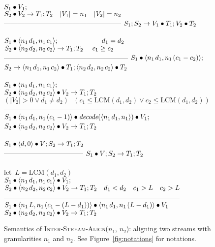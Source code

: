 \renewcommand{\skiptopa}[0]{\vspace{-2pt}\\}
\begin{figure}[t]
$S_1 \bullet V_1;$\skiptopa
$S_2 \bullet V_2 \rightarrow T_1; T_2~~~|V_1| = n_1~~~|V_2| = n_2$\vspace{-1pt}\skiptopa
---------------------------------------------------\skipbot
$S_1; S_2 \rightarrow V_1 \bullet T_1; V_2 \bullet T_2$
~ \\ ~ \\
$S_1 \bullet \langle n_1{\hspace{1.3pt}}d_1, n_1{\hspace{1.3pt}}c_1\rangle;~~~~~~~~~~~~~~~~~~~d_1 = d_2$\skiptopa
$S_2 \bullet \langle n_2{\hspace{1.3pt}}d_2, n_2{\hspace{1.3pt}}c_2\rangle \rightarrow T_1; T_2~~~~c_1 \ge c_2$\vspace{-2pt}\skiptopa
------------------------------------------------------\skipbot
$S_1 \bullet \langle n_1{\hspace{1.3pt}}d_1, n_1{\hspace{1.3pt}}(c_1-c_2)\rangle;$\\
$S_2 \rightarrow \langle n_1{\hspace{1.3pt}}d_1, n_1{\hspace{1.3pt}}c_2\rangle \bullet T_1; \langle n_2{\hspace{1.3pt}}d_2, n_2{\hspace{1.3pt}}c_2\rangle \bullet T_2$
~ \\ ~ \\
$S_1 \bullet \langle n_1{\hspace{1.3pt}}d_1, n_1{\hspace{1.3pt}}c_1\rangle;~~~~~~~~~~$\skiptopa
$S_2 \bullet \langle n_2{\hspace{1.3pt}}d_2, n_2{\hspace{1.3pt}}c_2\rangle \bullet V_2 \rightarrow T_1; T_2$\vspace{2pt}\\
$(|V_2| > 0 \vee d_1 \ne d_2)~~~(c_1 \le \mbox{LCM}(d_1,d_2) \vee c_2 \le \mbox{LCM}(d_1,d_2))$\vspace{-1pt}\skiptopa
--------------------------------------------------------------------------------\skipbot
$S_1 \bullet \langle n_1{\hspace{1.3pt}}d_1, n_1{\hspace{1.3pt}}(c_1-1)\rangle \bullet \mbox{\it decode}(\langle n_1{\hspace{1.3pt}}d_1, n_1\rangle) \bullet V_1;$\vspace{1pt}\\
$S_2 \bullet \langle n_2{\hspace{1.3pt}}d_2, n_2{\hspace{1.3pt}}c_2\rangle \bullet V_2 \rightarrow T_1; T_2$
~ \\ ~ \\
$S_1 \bullet \langle d, 0\rangle \bullet V; S_2 \rightarrow T_1; T_2$\skiptopa
-----------------------------------\skipbot
$S_1 \bullet V; S_2 \rightarrow T_1; T_2$
~ \\ ~ \\
let~$L=\mbox{LCM}(d_1,d_2)$\vspace{-3pt}\\
$S_1 \bullet \langle n_1{\hspace{1.3pt}}d_1, n_1{\hspace{1.3pt}}c_1\rangle \bullet V_1;$\\
$S_2 \bullet \langle n_2{\hspace{1.3pt}}d_2, n_2{\hspace{1.3pt}}c_2\rangle \bullet V_2 \rightarrow T_1; T_2~~~d_1 < d_2~~~c_1 > L~~~c_2 > L$\vspace{-4pt}\\
-----------------------------------------------------------------------------\skipbot
$S_1 \bullet \langle n_1{\hspace{1.3pt}}L, n_1{\hspace{1.3pt}}(c_1-(L-d_1))\rangle \bullet \langle n_1{\hspace{1.3pt}}d_1, n_1{\hspace{1.3pt}}(L-d_1)\rangle \bullet V_1$\\
$S_2 \bullet \langle n_2{\hspace{1.3pt}}d_2, n_2{\hspace{1.3pt}}c_2\rangle \bullet V_2 \rightarrow T_1; T_2$
\caption{Semantics of \textsc{Inter-Stream-Align}($n_1$, $n_2$):
aligning two streams with granularities $n_1$ and $n_2$.  See Figure~\ref{fig:notations} for notations.
\protect\label{fig:inter-stream-align}}
\end{figure}

